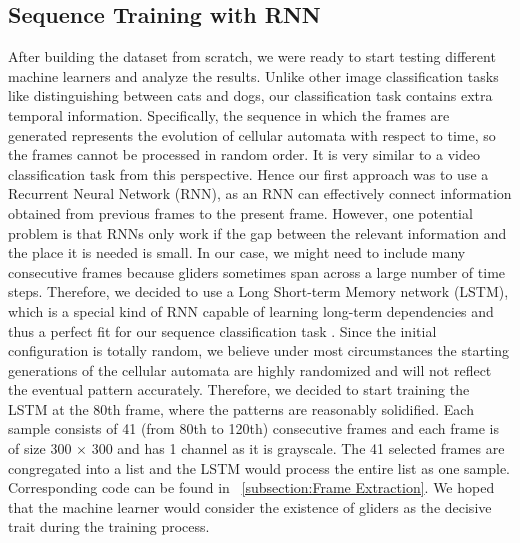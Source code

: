 \documentclass[12pt]{article}
\numberwithin{figure}{section} %
\begin{document}
\subsection{Sequence Training with RNN}
After building the dataset from scratch, we were ready to start testing different machine learners and analyze the results. Unlike other image classification tasks like distinguishing between cats and dogs, our classification task contains extra temporal information. Specifically, the sequence in which the frames are generated represents the evolution of cellular automata with respect to time, so the frames cannot be processed in random order. It is very similar to a video classification task from this perspective. Hence our first approach was to use a Recurrent Neural Network (RNN), as an RNN can effectively connect information obtained from previous frames to the present frame. However, one potential problem is that RNNs only work if the gap between the relevant information and the place it is needed is small. In our case, we might need to include many consecutive frames because gliders sometimes span across a large number of time steps. Therefore, we decided to use a Long Short-term Memory network (LSTM), which is a special kind of RNN capable of learning long-term dependencies and thus a perfect fit for our sequence classification task \cite{LSTM}. Since the initial configuration is totally random, we believe under most circumstances the starting generations of the cellular automata are highly randomized and will not reflect the eventual pattern accurately. Therefore, we decided to start training the LSTM at the 80th frame, where the patterns are reasonably solidified. Each sample consists of 41 (from 80th to 120th) consecutive frames and each frame is of size 300 × 300 and has 1 channel as it is grayscale. The 41 selected frames are congregated into a list and the LSTM would process the entire list as one sample. Corresponding code can be found in ~\ref{subsection:Frame Extraction}. We hoped that the machine learner would consider the existence of gliders as the decisive trait during the training process. 
\end{document}
